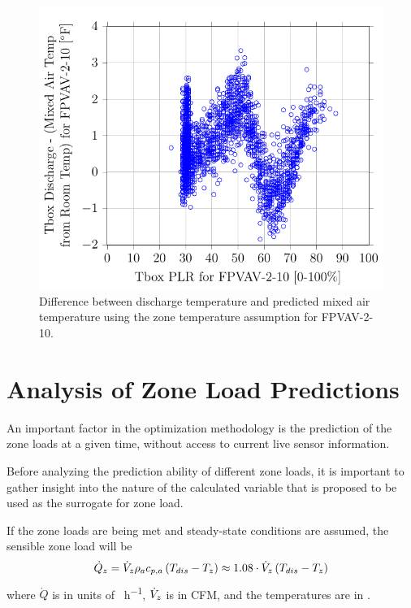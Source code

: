 \begin{figure}
\centering
\includegraphics[]{Plots/2017-01-10-0906-TboxDischargeMixedAirTempfromRoomTempforFPVAV210vsTboxPLRforFPVAV210.pdf}
\caption{Difference between discharge temperature and predicted mixed
air temperature using the zone temperature assumption for FPVAV-2-10.}
\label{fig:2017-01-10-0906-TboxDischargeMixedAirTempfromRoomTempforFPVAV210vsTboxPLRforFPVAV210}
\end{figure}




\section{Analysis of Zone Load Predictions}

An important factor in the optimization methodology is the prediction of
the zone loads at a given time, without access to current live sensor
information. 

Before analyzing the prediction ability of different zone loads, it is
important to gather insight into the nature of the calculated variable
that is proposed to be used as the surrogate for zone load.   

If the zone loads are being met and steady-state conditions are assumed,
the sensible zone load will be
\begin{equation}\label{eq:ApproximateZoneLoad}
    \dot{Q}_{z}=\dot{V}_{z} \rho_a c_{p,a}{} \left(T_{dis}-T_{z} \right) \approx 1.08 \cdot \dot{V}_{z}\left(T_{dis}-T_{z} \right)
\end{equation}
where \(\dot{Q}\) is in units of \si{\btu\per\hour}, \(\dot{V}_{z}\) is in CFM, and the temperatures are in \si{\degreeF}.

